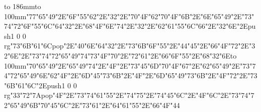 \hbox to 186mm{\hsize=81mm\vbox to 100mm{\vfill\ipa\char"77\ipa\char"65\ipa\char"49\ipa\char"2E\ipa\char"6F\ipa\char"55\ipa\char"62\ipa\char"2E\ipa\char"32\ipa\char"2E\ipa\char"70\ipa\char"4F\ipa\char"62\medskip\ipa\char"70\ipa\char"4F\ipa\char"6B\ipa\char"2E\ipa\char"6E\ipa\char"65\ipa\char"49\ipa\char"2E\ipa\char"73\ipa\char"74\ipa\char"72\ipa\char"6F\ipa\char"55\ipa\char"6C\medskip\ipa\char"64\ipa\char"32\ipa\char"2E\ipa\char"68\ipa\char"4F\ipa\char"6E\ipa\char"74\ipa\char"2E\ipa\char"32\ipa\char"2E\ipa\char"62\ipa\char"61\ipa\char"55\ipa\char"6C\ipa\char"66\ipa\char"2E\ipa\char"32\ipa\char"6E\ipa\char"2E\pdfcolorstack\match push{1 0 0 rg}\ipa\char"73\ipa\char"6B\ipa\char"61\ipa\char"6C\pdfcolorstack\match pop{}\ipa\char"2E\ipa\char"40\ipa\char"6E\ipa\char"64\medskip\ipa\char"32\ipa\char"2E\ipa\char"73\ipa\char"6B\ipa\char"6F\ipa\char"55\ipa\char"2E\ipa\char"44\ipa\char"45\ipa\char"2E\ipa\char"66\ipa\char"4F\ipa\char"72\ipa\char"2E\ipa\char"32\ipa\char"6E\ipa\char"2E\ipa\char"73\ipa\char"74\ipa\char"72\ipa\char"65\ipa\char"49\ipa\char"74\medskip\ipa\char"73\ipa\char"4F\ipa\char"70\ipa\char"2E\ipa\char"72\ipa\char"61\ipa\char"2E\ipa\char"66\ipa\char"6F\ipa\char"55\ipa\char"2E\ipa\char"68\ipa\char"32\ipa\char"6E\vfill}\hfill\vbox to 100mm{\vfill\ipa\char"70\ipa\char"65\ipa\char"49\ipa\char"2E\ipa\char"65\ipa\char"49\ipa\char"74\ipa\char"2E\ipa\char"4F\ipa\char"2E\ipa\char"73\ipa\char"45\ipa\char"6D\medskip\ipa\char"70\ipa\char"4F\ipa\char"67\ipa\char"2E\ipa\char"62\ipa\char"65\ipa\char"49\ipa\char"2E\ipa\char"73\ipa\char"74\ipa\char"72\ipa\char"65\ipa\char"49\ipa\char"6E\medskip\ipa\char"62\ipa\char"4F\ipa\char"2E\ipa\char"6D\ipa\char"45\ipa\char"73\ipa\char"6B\ipa\char"2E\ipa\char"4F\ipa\char"2E\ipa\char"6D\ipa\char"65\ipa\char"49\ipa\char"73\ipa\char"6B\ipa\char"2E\ipa\char"4F\ipa\char"72\ipa\char"2E\ipa\char"73\ipa\char"6B\ipa\char"61\ipa\char"6C\ipa\char"2E\pdfcolorstack\match push{1 0 0 rg}\ipa\char"33\ipa\char"72\ipa\char"7A\pdfcolorstack\match pop{}\medskip\ipa\char"4F\ipa\char"2E\ipa\char"73\ipa\char"74\ipa\char"61\ipa\char"55\ipa\char"2E\ipa\char"74\ipa\char"75\ipa\char"2E\ipa\char"74\ipa\char"45\ipa\char"6C\ipa\char"2E\ipa\char"4F\ipa\char"6C\ipa\char"2E\ipa\char"73\ipa\char"74\ipa\char"72\ipa\char"65\ipa\char"49\ipa\char"6B\medskip\ipa\char"70\ipa\char"45\ipa\char"6C\ipa\char"2E\ipa\char"73\ipa\char"61\ipa\char"2E\ipa\char"64\ipa\char"61\ipa\char"55\ipa\char"2E\ipa\char"66\ipa\char"4F\ipa\char"44\vfill}}\eject
